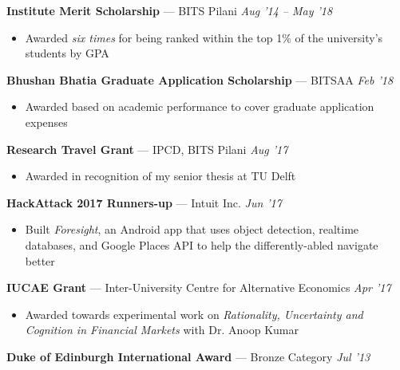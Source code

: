\documentclass[10pt]{article}
\newenvironment{innerlist}[1][\enskip\textbullet]%
        {\begin{itemize}[#1,leftmargin=*,parsep=0pt,itemsep=0pt,topsep=0pt,partopsep=0pt]}
        {\end{itemize}}
\newcommand{\halfblankline}{\quad\vspace{-0.5\baselineskip}\pagebreak[3]}
\begin{document}
\textbf{Institute Merit Scholarship} --- BITS Pilani \hfill \emph{Aug '14 -- May '18}
\begin{innerlist}
\item[] Awarded \emph{six times} for being ranked within the top 1\% of the university's students by GPA
\end{innerlist}

\halfblankline

\textbf{Bhushan Bhatia Graduate Application Scholarship} --- BITSAA \hfill \emph{Feb '18}
\begin{innerlist}
\item[] Awarded based on academic performance to cover graduate application expenses
\end{innerlist}

\halfblankline

\textbf{Research Travel Grant} --- IPCD, BITS Pilani \hfill \emph{Aug '17}
\begin{innerlist}
\item[] Awarded in recognition of my senior thesis at TU Delft
\end{innerlist}
\halfblankline

\textbf{HackAttack 2017 Runners-up} --- Intuit Inc. \hfill \emph{Jun '17}
\begin{innerlist}
\item[] Built \textit{Foresight}, an Android app that uses object detection, realtime databases, and Google Places API to help the differently-abled navigate better
\end{innerlist}

\halfblankline

\textbf{IUCAE Grant} --- Inter-University Centre for Alternative Economics
\hfill \emph{Apr '17}
\begin{innerlist}
\item[] Awarded towards experimental work on \emph{Rationality, Uncertainty and Cognition in Financial Markets} with Dr. Anoop Kumar
\end{innerlist}

\halfblankline

\textbf{Duke of Edinburgh International Award} --- Bronze Category \hfill \emph{Jul '13}
\end{document}
